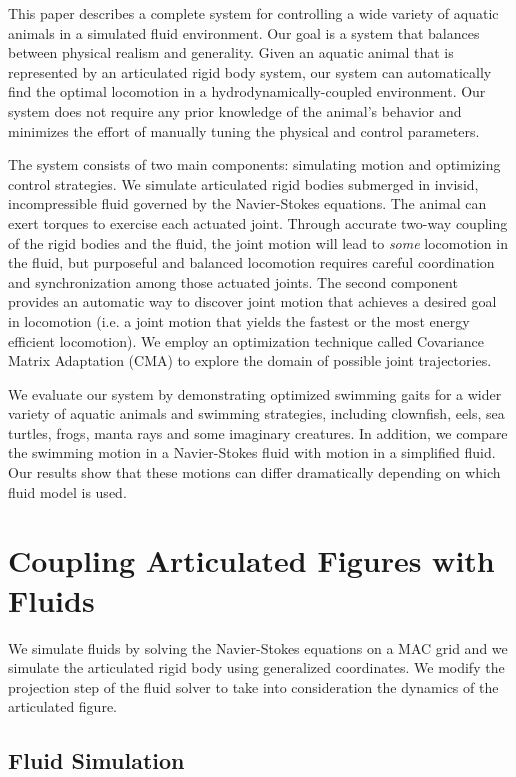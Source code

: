 This paper describes a complete system for controlling a wide variety of
aquatic animals in a simulated fluid environment. Our goal is a system
that balances between physical realism and generality. Given an aquatic
animal that is represented by an articulated rigid body system, our system
can automatically find the optimal locomotion in a
hydrodynamically-coupled environment. Our system does not require any
prior knowledge of the animal's behavior and minimizes the effort of
manually tuning the physical and control parameters.

The system consists of two main components: simulating motion and
optimizing control strategies. We simulate articulated rigid bodies
submerged in invisid, incompressible fluid governed by the Navier-Stokes
equations. The animal can exert torques to exercise each actuated
joint. Through accurate two-way coupling of the rigid bodies and the
fluid, the joint motion will lead to \emph{some} locomotion in the
fluid, but purposeful and balanced locomotion requires careful
coordination and synchronization among those actuated joints.  The
second component provides an automatic way to discover joint motion
that achieves a desired goal in locomotion (i.e. a joint motion that
yields the fastest or the most energy efficient locomotion).  We
employ an optimization technique called Covariance Matrix Adaptation
(CMA) to explore the domain of possible joint trajectories.

We evaluate our system by demonstrating optimized swimming gaits for a
wider variety of aquatic animals and swimming strategies, including
clownfish, eels, sea turtles, frogs, manta rays and some imaginary
creatures. In addition, we compare the swimming motion in a Navier-Stokes
fluid with motion in a simplified fluid. Our results show that these
motions can differ dramatically depending on which fluid model is used.

\section{Coupling Articulated Figures with Fluids}

We simulate fluids by solving the Navier-Stokes equations on a MAC grid
and we simulate the articulated rigid body using generalized coordinates.
We modify the projection step of the fluid solver to take into
consideration the dynamics of the articulated figure.

\subsection{Fluid Simulation}

